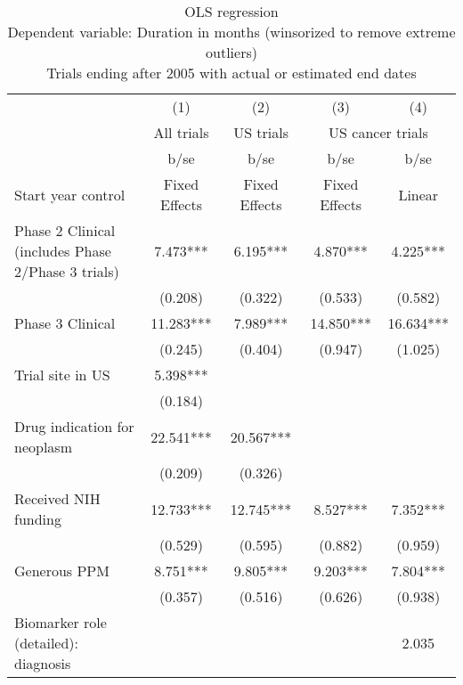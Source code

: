 
\begin{table}[htb]\centering
\caption{OLS regression \\ Dependent variable: Duration in months (winsorized to remove extreme outliers) \\ Trials ending after 2005 with actual or estimated end dates}
\begin{tabular}{l*{4}c}

                    &     (1)       &         (2)   &       (3)     &     (4)      \\
                    &    All trials  &  US trials & \multicolumn{2}{c}{US cancer trials} \\                    
                    &        b/se   &        b/se   &        b/se   &        b/se   \\
\hline
Start year control & Fixed Effects   &  Fixed Effects   &  Fixed Effects   & Linear   \\
Phase 2 Clinical (includes Phase 2/Phase 3 trials)&       7.473***&       6.195***&       4.870***&       4.225***\\
                    &     (0.208)   &     (0.322)   &     (0.533)   &     (0.582)   \\
Phase 3 Clinical    &      11.283***&       7.989***&      14.850***&      16.634***\\
                    &     (0.245)   &     (0.404)   &     (0.947)   &     (1.025)   \\
Trial site in US    &       5.398***&               &               &               \\
                    &     (0.184)   &               &               &               \\
Drug indication for neoplasm&      22.541***&      20.567***&               &               \\
                    &     (0.209)   &     (0.326)   &               &               \\
Received NIH funding&      12.733***&      12.745***&       8.527***&       7.352***\\
                    &     (0.529)   &     (0.595)   &     (0.882)   &     (0.959)   \\
Generous PPM        &       8.751***&       9.805***&       9.203***&       7.804***\\
                    &     (0.357)   &     (0.516)   &     (0.626)   &     (0.938)   \\
Biomarker role (detailed): diagnosis&               &               &               &       2.035   \\

\end{tabular}
\end{table}
